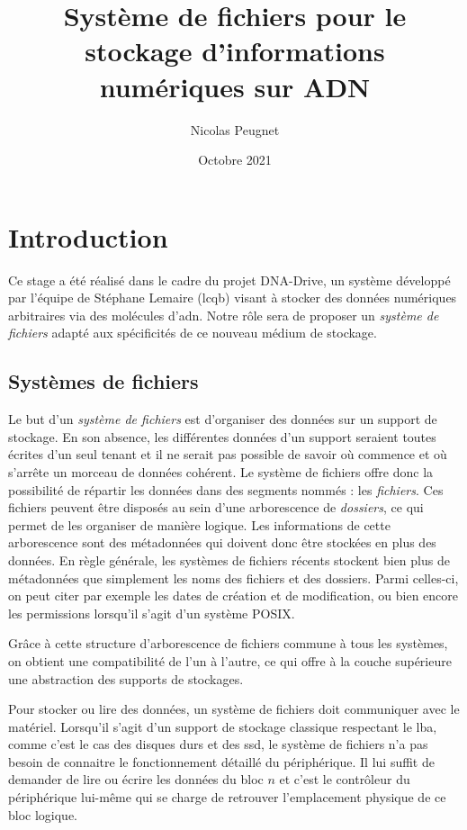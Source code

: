 \documentclass[a4paper]{report}
\title{Système de fichiers pour le stockage d’informations numériques sur ADN}
\date{Octobre 2021}
\author{Nicolas Peugnet}
\begin{document}
\begin{titlepage}
\maketitle
\end{titlepage}

\tableofcontents

\chapter{Introduction}

Ce stage a été réalisé dans le cadre du projet DNA-Drive,
un système développé par l'équipe de Stéphane Lemaire (\ac{lcqb})
visant à stocker des données numériques arbitraires via des molécules d'\ac{adn}.
Notre rôle sera de proposer un \emph{système de fichiers} adapté aux spécificités de ce nouveau médium de stockage.

\section{Systèmes de fichiers}

Le but d'un \emph{système de fichiers} est d'organiser des données sur un support de stockage.
En son absence, les différentes données d'un support seraient toutes écrites d'un seul tenant
et il ne serait pas possible de savoir où commence et où s'arrête un morceau de données cohérent.
Le système de fichiers offre donc la possibilité de répartir les données dans des segments nommés : les \emph{fichiers}.
Ces fichiers peuvent être disposés au sein d'une arborescence de \emph{dossiers},
ce qui permet de les organiser de manière logique.
Les informations de cette arborescence sont des métadonnées qui doivent donc être stockées en plus des données.
En règle générale, les systèmes de fichiers récents stockent bien plus de métadonnées que simplement les noms des fichiers et des dossiers.
Parmi celles-ci, on peut citer par exemple les dates de création et de modification,
ou bien encore les permissions lorsqu'il s'agit d'un système POSIX.

Grâce à cette structure d'arborescence de fichiers commune à tous les systèmes,
on obtient une compatibilité de l'un à l'autre,
ce qui offre à la couche supérieure une abstraction des supports de stockages.

Pour stocker ou lire des données, un système de fichiers doit communiquer avec le matériel.
Lorsqu'il s'agit d'un support de stockage classique respectant le \ac{lba},
comme c'est le cas des disques durs et des \ac{ssd},
le système de fichiers n'a pas besoin de connaitre le fonctionnement détaillé du périphérique.
Il lui suffit de demander de lire ou écrire les données du bloc $n$
et c'est le contrôleur du périphérique lui-même qui se charge de retrouver l'emplacement physique de ce bloc logique.
\end{document}

